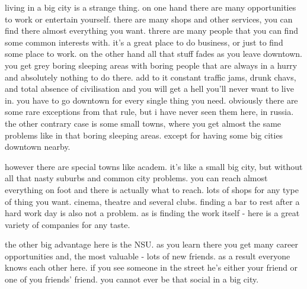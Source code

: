 \documentclass[russian]{article}
\begin{document}
living in a big city is a strange thing. %
on one hand there are many opportunities to work or entertain yourself. %
there are many shops and other services, you can find there almost everything you want. %
threre are many people that you can find some common interests with. %
it's a great place to do business, or just to find some place to work. %
on the other hand all that stuff fades as you leave downtown. %
you get grey boring sleeping areas with boring people that are always in a hurry and absolutely nothing to do there. %
add to it constant traffic jams, drunk chavs, and total absence of civilisation and you will get a hell you'll never want to live in. %
you have to go downtown for every single thing you need. %
obviously there are some rare exceptions from that rule, but i have never seen them here, in russia. %
the other contrary case is some small towns, where you get almost the same problems like in that boring sleeping areas. %
except for having some big cities downtown nearby. %

however there are special towns like academ. %
it's like a small big city, but without all that nasty suburbs and common city problems. %
you can reach almost everything on foot and there is actually what to reach. %
lots of shops for any type of thing you want. %
cinema, theatre and several clubs. %
finding a bar to rest after a hard work day is also not a problem. %
as is finding the work itself - here is a great variety of companies for any taste. %


the other big advantage here is the NSU. %
as you learn there you get many career opportunities and, the most valuable - lots of new friends. %
as a result everyone knows each other here. %
if you see someone in the street he's either your friend or one of you friends' friend. %
you cannot ever be that social in a big city. %

\end{document}

